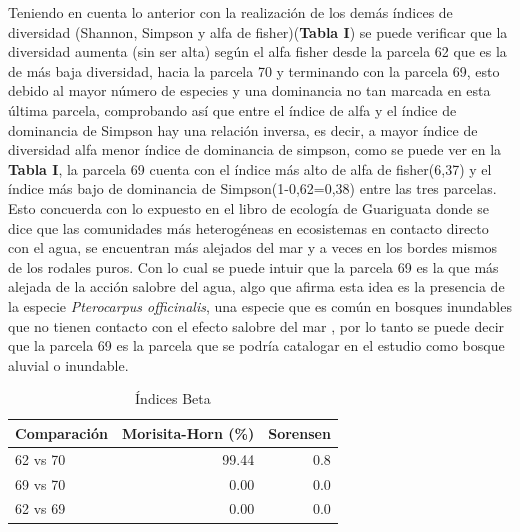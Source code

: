 \documentclass[conference,final,12pt,]{IEEEtran}
\begin{document}
Teniendo en cuenta lo anterior con la realización de los demás índices
de diversidad (Shannon, Simpson y alfa de fisher)(\textbf{Tabla I}) se
puede verificar que la diversidad aumenta (sin ser alta) según el alfa
fisher desde la parcela 62 que es la de más baja diversidad, hacia la
parcela 70 y terminando con la parcela 69, esto debido al mayor número
de especies y una dominancia no tan marcada en esta última parcela,
comprobando así que entre el índice de alfa y el índice de dominancia de
Simpson hay una relación inversa, es decir, a mayor índice de diversidad
alfa menor índice de dominancia de simpson, como se puede ver en la
\textbf{Tabla I}, la parcela 69 cuenta con el índice más alto de alfa de
fisher(6,37) y el índice más bajo de dominancia de Simpson(1-0,62=0,38)
entre las tres parcelas. Esto concuerda con lo expuesto en el libro de
ecología de Guariguata donde se dice que las comunidades más
heterogéneas en ecosistemas en contacto directo con el agua, se
encuentran más alejados del mar y a veces en los bordes mismos de los
rodales puros. Con lo cual se puede intuir que la parcela 69 es la que
más alejada de la acción salobre del agua, algo que afirma esta idea es
la presencia de la especie \emph{Pterocarpus officinalis}, una especie
que es común en bosques inundables que no tienen contacto con el efecto
salobre del mar \citep{Y}, por lo tanto se puede decir que la parcela 69
es la parcela que se podría catalogar en el estudio como bosque aluvial
o inundable.

\begin{table}

\caption{\label{tab:unnamed-chunk-3}Índices Beta}
\centering
\begin{tabular}[t]{l|r|r}
\hline
Comparación & Morisita-Horn (\%) & Sorensen\\
\hline
62 vs 70 & 99.44 & 0.8\\
\hline
69 vs 70 & 0.00 & 0.0\\
\hline
62 vs 69 & 0.00 & 0.0\\
\hline
\end{tabular}
\end{table}
\end{document}
